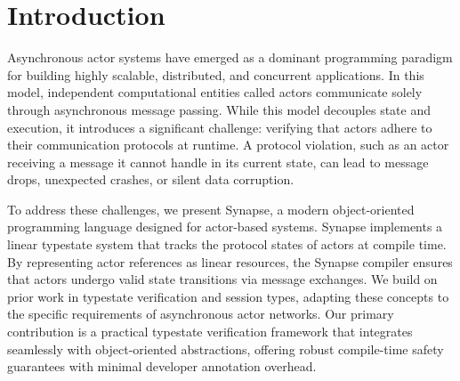 \section{Introduction}
Asynchronous actor systems have emerged as a dominant programming paradigm for building highly scalable, distributed, and concurrent applications. In this model, independent computational entities called actors communicate solely through asynchronous message passing. While this model decouples state and execution, it introduces a significant challenge: verifying that actors adhere to their communication protocols at runtime. A protocol violation, such as an actor receiving a message it cannot handle in its current state, can lead to message drops, unexpected crashes, or silent data corruption.

To address these challenges, we present Synapse, a modern object-oriented programming language designed for actor-based systems. Synapse implements a linear typestate system that tracks the protocol states of actors at compile time. By representing actor references as linear resources, the Synapse compiler ensures that actors undergo valid state transitions via message exchanges. We build on prior work in typestate verification and session types, adapting these concepts to the specific requirements of asynchronous actor networks. Our primary contribution is a practical typestate verification framework that integrates seamlessly with object-oriented abstractions, offering robust compile-time safety guarantees with minimal developer annotation overhead.
